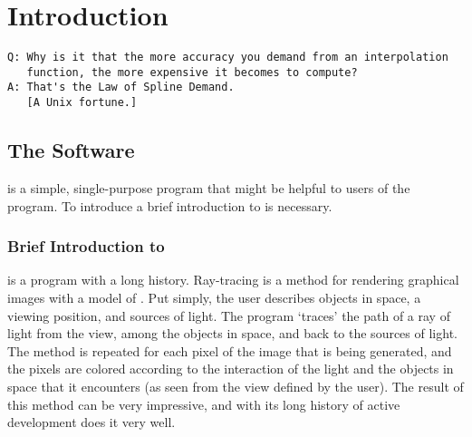 \chapter{Introduction}
\ifMKwx
	\small
\begin{verbatim}
Q: Why is it that the more accuracy you demand from an interpolation
   function, the more expensive it becomes to compute?
A: That's the Law of Spline Demand.
   [A Unix fortune.]
\end{verbatim}
	\normalsize
\else
\fi %

\section{The Software}%
\IXpkgu{} is a simple, single-purpose program that might
be helpful to users of the \IXpov{} program.
To introduce \IXpkg{} a brief introduction to \IXpov{} is necessary.

	\subsection{Brief Introduction to \dtypov}
\IXpov{} is a  program with a long history.
Ray-tracing is a method for rendering
graphical images with a model of .
Put simply, the user describes objects in space, a viewing position,
and sources of light. The program `traces' the path of a ray of
light from the view, among the objects in space, and back to the sources
of light. The method is repeated for each pixel of the image that
is being generated, and the pixels are colored according to the
interaction of the light and the objects in space that it encounters
(as seen from the view defined by the user).
The result of this method can be very impressive, and with its
long history of active development \IXpov{} does it very well.

